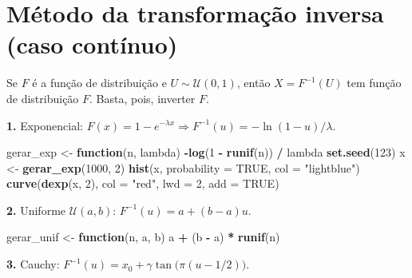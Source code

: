\documentclass[
  portuguese,
  11pt,
  openany]{book}
\newenvironment{Shaded}{\begin{snugshade}}{\end{snugshade}}
\newcommand{\AttributeTok}[1]{\textcolor[rgb]{0.13,0.29,0.53}{#1}}
\newcommand{\ConstantTok}[1]{\textcolor[rgb]{0.56,0.35,0.01}{#1}}
\newcommand{\ControlFlowTok}[1]{\textcolor[rgb]{0.13,0.29,0.53}{\textbf{#1}}}
\newcommand{\DecValTok}[1]{\textcolor[rgb]{0.00,0.00,0.81}{#1}}
\newcommand{\FunctionTok}[1]{\textcolor[rgb]{0.13,0.29,0.53}{\textbf{#1}}}
\newcommand{\NormalTok}[1]{#1}
\newcommand{\OtherTok}[1]{\textcolor[rgb]{0.56,0.35,0.01}{#1}}
\newcommand{\SpecialCharTok}[1]{\textcolor[rgb]{0.81,0.36,0.00}{\textbf{#1}}}
\newcommand{\StringTok}[1]{\textcolor[rgb]{0.31,0.60,0.02}{#1}}
\begin{document}
\section{Método da transformação inversa (caso contínuo)}\label{muxe9todo-da-transformauxe7uxe3o-inversa-caso-contuxednuo}

Se \(F\) é a função de distribuição e \(U \sim \mathcal{U}(0,1)\), então
\(X = F^{-1}(U)\) tem função de distribuição \(F\). Basta, pois, inverter \(F\).

\textbf{1.} Exponencial: \(F(x) = 1 - e^{-\lambda x} \Rightarrow F^{-1}(u) = -\ln(1-u)/\lambda\).

\begin{Shaded}
\begin{Highlighting}[]
\NormalTok{gerar\_exp }\OtherTok{\textless{}{-}} \ControlFlowTok{function}\NormalTok{(n, lambda) }\SpecialCharTok{{-}}\FunctionTok{log}\NormalTok{(}\DecValTok{1} \SpecialCharTok{{-}} \FunctionTok{runif}\NormalTok{(n)) }\SpecialCharTok{/}\NormalTok{ lambda}
\FunctionTok{set.seed}\NormalTok{(}\DecValTok{123}\NormalTok{)}
\NormalTok{x }\OtherTok{\textless{}{-}} \FunctionTok{gerar\_exp}\NormalTok{(}\DecValTok{1000}\NormalTok{, }\DecValTok{2}\NormalTok{)}
\FunctionTok{hist}\NormalTok{(x, }\AttributeTok{probability =} \ConstantTok{TRUE}\NormalTok{, }\AttributeTok{col =} \StringTok{"lightblue"}\NormalTok{)}
\FunctionTok{curve}\NormalTok{(}\FunctionTok{dexp}\NormalTok{(x, }\DecValTok{2}\NormalTok{), }\AttributeTok{col =} \StringTok{"red"}\NormalTok{, }\AttributeTok{lwd =} \DecValTok{2}\NormalTok{, }\AttributeTok{add =} \ConstantTok{TRUE}\NormalTok{)}
\end{Highlighting}
\end{Shaded}

\textbf{2.} Uniforme \(\mathcal{U}(a,b)\): \(F^{-1}(u) = a + (b-a)u\).

\begin{Shaded}
\begin{Highlighting}[]
\NormalTok{gerar\_unif }\OtherTok{\textless{}{-}} \ControlFlowTok{function}\NormalTok{(n, a, b) a }\SpecialCharTok{+}\NormalTok{ (b }\SpecialCharTok{{-}}\NormalTok{ a) }\SpecialCharTok{*} \FunctionTok{runif}\NormalTok{(n)}
\end{Highlighting}
\end{Shaded}

\textbf{3.} Cauchy: \(F^{-1}(u) = x_0 + \gamma \tan\!\big(\pi(u - 1/2)\big)\).
\end{document}
